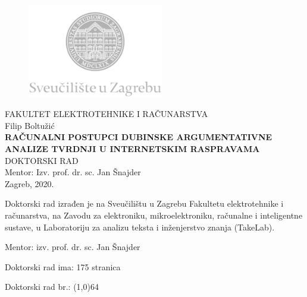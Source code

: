 \begin{titlepage}
  \fontsize{16pt}{20pt}\selectfont
  \selectfont
  \setlength{\intextsep}{0pt plus 0pt minus 0pt}

  \begin{center}
    \begin{figure}[ht!]
      \begin{center}
        \includegraphics[height=4.1184cm, width=5.94cm]{logo_unizg2}
      \end{center}
    \end{figure}		
    \vspace{0cm}
    {FAKULTET ELEKTROTEHNIKE I RAČUNARSTVA} \\
    \vspace{3cm}
    Filip Boltužić \\
    \vspace{2cm}
    {\fontsize{22pt}{22pt}\selectfont\textbf{
RAČUNALNI POSTUPCI DUBINSKE ARGUMENTATIVNE ANALIZE TVRDNJI U INTERNETSKIM RASPRAVAMA
}} \\
    \vspace{2cm}    
    DOKTORSKI RAD \\
    \vspace{5cm}    %
	Mentor: Izv. prof. dr. sc. Jan Šnajder \\
    \vfill{Zagreb, 2020.}
  \end{center}
  \restoregeometry
\end{titlepage}


\begin{titlepage}
  \begin{minipage}{\dimexpr\textwidth-1cm}
    \vspace{3cm}
    Doktorski rad izrađen je na Sveučilištu u Zagrebu
    Fakultetu elektrotehnike i računarstva, na Zavodu za 
    elektroniku, mikroelektroniku, računalne i inteligentne sustave, u 
    Laboratoriju za analizu teksta i inženjerstvo znanja (TakeLab).

    \vspace{1cm}
    Mentor: izv. prof. dr. sc. Jan Šnajder

    \vspace{1cm}
    Doktorski rad ima: 175 stranica

    \vspace{1cm}
    Doktorski rad br.: \line(1,0){64}
  \end{minipage}
\end{titlepage}

